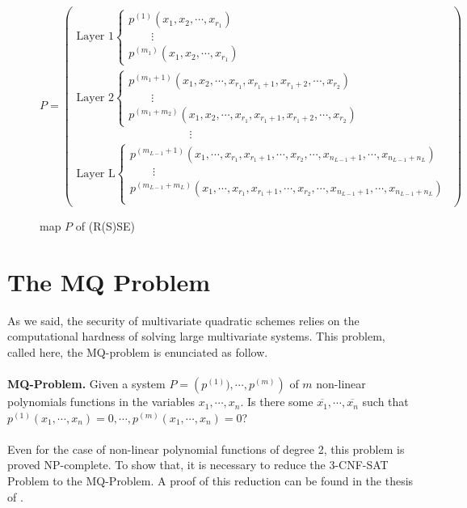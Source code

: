 \begin{figure}
\footnotesize
\[
 P=\left(\begin{array}{l}
 \text{Layer 1}  \left\{\begin{array}{l}
    p^{(1)}(x_1,x_2,\cdots,x_{r_1})  \\
    \quad\quad\vdots\\
    p^{(m_1)}(x_1,x_2,\cdots,x_{r_1})
    \end{array}
    \right.%
    \\
 \text{Layer 2}   \left\{\begin{array}{l}
    p^{(m_1+1)}(x_1,x_2,\cdots,x_{r_1}, x_{r_1+1},x_{r_1+2},\cdots,x_{r_2})  \\
    \quad\quad\vdots\\
    p^{(m_1+m_2)}(x_1,x_2,\cdots,x_{r_1}, x_{r_1+1},x_{r_1+2},\cdots,x_{r_2}) 
     \end{array}
    \right.%
   \\
   \quad\quad\quad\quad\quad \quad\quad\quad\quad\quad \vdots\\
 \text{Layer L}   \left\{\begin{array}{l}
   p^{\left(m_{L-1}+1\right)}(x_1,\cdots,x_{r_1}, x_{r_1+1},\cdots,x_{r_2},\cdots, x_{n_{L-1}+1}, \cdots, x_{n_{L-1}+n_L})  \\
    \quad\quad\vdots\\
    p^{(m_{L-1}+m_L)}(x_1,\cdots,x_{r_1}, x_{r_1+1},\cdots,x_{r_2},\cdots, x_{n_{L-1}+1}, \cdots, x_{n_{L-1}+n_L}) \\
   \end{array}\right.
   \end{array}
   \right)
\]
\caption{map $P$ of (R(S)SE)}
\label{fig:RSSE}
\end{figure}
\section{The MQ Problem}
 
As we said, the security of multivariate quadratic schemes relies on the computational hardness of solving large multivariate systems. This problem, called here, the MQ-problem is enunciated as follow. \\
\\
\noindent
\textbf{MQ-Problem.} Given a system $P=\left(p^{(1)}),\cdots, p^{(m)}\right)$ of $m$ non-linear polynomials functions in the variables $x_1,\cdots, x_n$. Is there some $\overline{x_1}, \cdots, \overline{x_n}$ such that $p^{(1)}(x_1,\cdots, x_n)=0, \cdots, p^{(m)}(x_1,\cdots, x_n) = 0$?\\
\\
\noindent
Even for the case of non-linear polynomial functions of degree 2, this problem is proved NP-complete. To show that, it is necessary to reduce the 3-CNF-SAT Problem to the MQ-Problem. A proof of this reduction can be found in the thesis of \cite{wolfphdthesis}. 
